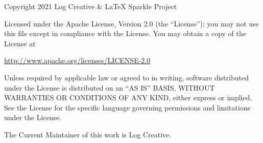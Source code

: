 \documentclass[a4paper,12pt]{article}
\begin{document}




\vfill

\scriptsize  

Copyright 2021 Log Creative \& \LaTeX{} Sparkle Project

Licensed under the Apache License, Version 2.0 (the ``License'');
you may not use this file except in compliance with the License.
You may obtain a copy of the License at

    \href{http://www.apache.org/licenses/LICENSE-2.0}{http://www.apache.org/licenses/LICENSE-2.0}

Unless required by applicable law or agreed to in writing, software
distributed under the License is distributed on an ``AS IS'' BASIS,
WITHOUT WARRANTIES OR CONDITIONS OF ANY KIND, either express or implied.
See the License for the specific language governing permissions and
limitations under the License.

The Current Maintainer of this work is Log Creative.

\vfill

%
\end{document}
